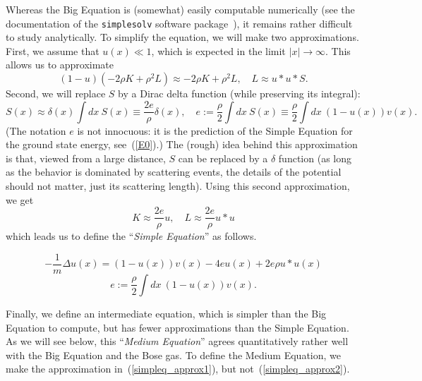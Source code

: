 \documentclass{ian}
\begin{document}
\indent
Whereas the Big Equation is (somewhat) easily computable numerically (see the documentation of the {\tt simplesolv} software package\-~\cite{ss}), it remains rather difficult to study analytically.
To simplify the equation, we will make two approximations.
First, we assume that $u(x)\ll 1$, which is expected in the limit $|x|\to\infty$.
This allows us to approximate
\begin{equation}
  (1-u)(-2\rho K+\rho^2L)\approx-2\rho K+\rho^2L
  ,\quad
  L\approx u\ast u\ast S
  .
  \label{simpleq_approx1}
\end{equation}
Second, we will replace $S$ by a Dirac delta function (while preserving its integral):
\begin{equation}
  S(x)\approx\delta(x)\int dx\ S(x)\equiv\frac{2e}\rho\delta(x)
  ,\quad
  e:=\frac\rho2\int dx\ S(x)\equiv\frac\rho2\int dx\ (1-u(x))v(x)
  .
\end{equation}
(The notation $e$ is not innocuous: it is the prediction of the Simple Equation for the ground state energy, see\-~(\ref{E0}).)
The (rough) idea behind this approximation is that, viewed from a large distance, $S$ can be replaced by a $\delta$ function (as long as the behavior is dominated by scattering events, the details of the potential should not matter, just its scattering length).
Using this second approximation, we get
\begin{equation}
  K\approx\frac{2e}\rho u
  ,\quad
  L\approx\frac{2e}\rho u\ast u
  \label{simpleq_approx2}
\end{equation}
which leads us to define the ``{\it Simple Equation}'' as follows.
\bigskip

  \begin{equation}
    -\frac1m\Delta u(x)=(1-u(x))v(x)-4e u(x)+2e\rho u\ast u(x)
    \label{simpleq}
  \end{equation}
  \nopagebreakaftereq
  \begin{equation}
    e:=\frac\rho2\int dx\ (1-u(x))v(x)
    .
    \label{energy}
  \end{equation}
\endtheo
\restorepagebreakaftereq
\bigskip

\indent
Finally, we define an intermediate equation, which is simpler than the Big Equation to compute, but has fewer approximations than the Simple Equation.
As we will see below, this ``{\it Medium Equation}'' agrees quantitatively rather well with the Big Equation and the Bose gas.
To define the Medium Equation, we make the approximation in\-~(\ref{simpleq_approx1}), but not\-~(\ref{simpleq_approx2}).
\bigskip
\end{document}
